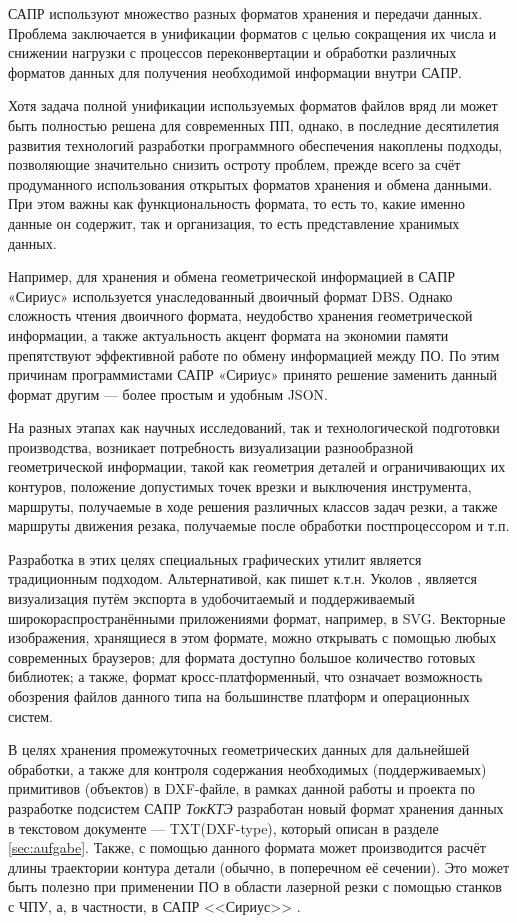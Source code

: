 САПР используют множество разных форматов хранения и передачи данных. Проблема заключается в унификации форматов с целью сокращения их числа и снижении нагрузки с процессов переконвертации и обработки различных форматов данных для получения необходимой информации внутри САПР.

Хотя задача полной унификации используемых форматов файлов вряд ли может быть полностью решена для современных  ПП, однако, в последние десятилетия развития технологий разработки программного обеспечения накоплены подходы, позволяющие значительно снизить остроту проблем, прежде всего за счёт продуманного использования открытых форматов хранения и обмена данными. При этом важны как функциональность формата, то есть то, какие именно данные он содержит, так и организация, то есть представление хранимых данных.

Например, для хранения и обмена геометрической информацией в САПР «Сириус» используется унаследованный двоичный формат DBS. Однако сложность чтения двоичного формата, неудобство хранения геометрической информации, а также актуальность акцент формата на экономии памяти препятствуют эффективной работе по обмену информацией между ПО. По этим причинам программистами САПР «Сириус» принято решение заменить данный формат другим --- более простым и удобным JSON.

На разных этапах как научных исследований, так и технологической подготовки производства, возникает потребность визуализации разнообразной геометрической информации, такой как геометрия деталей и ограничивающих их контуров, положение допустимых точек врезки и выключения инструмента, маршруты, получаемые в ходе решения различных классов задач резки, а также маршруты движения резака, получаемые после обработки постпроцессором и т.п.

Разработка в этих целях специальных графических утилит является традиционным подходом. Альтернативой, как пишет к.т.н. Уколов \cite{ukoloff}, является визуализация путём экспорта в удобочитаемый и поддерживаемый широкораспространёнными приложениями формат, например, в SVG. Векторные изображения, хранящиеся в этом формате, можно открывать с помощью любых современных браузеров; для формата доступно большое количество готовых библиотек; а также, формат кросс-платформенный, что означает возможность обозрения файлов данного типа на большинстве платформ и операционных систем.

В целях хранения промежуточных геометрических данных для дальнейшей обработки, а также для контроля содержания необходимых (поддерживаемых) примитивов (объектов) в DXF-файле, в рамках данной работы и проекта по разработке подсистем САПР \textit{ТокКТЭ} разработан новый формат хранения данных в текстовом документе --- TXT(DXF-type), который описан в разделе \ref{sec:aufgabe}. Также, с помощью данного формата может производится расчёт длины траектории  контура детали (обычно, в поперечном её сечении). Это может быть полезно при применении ПО в области лазерной резки с помощью станков с ЧПУ, а, в частности, в САПР <<Сириус>> \cite{petunin}.

